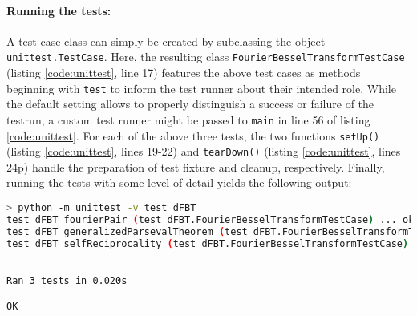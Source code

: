 \documentclass[12pt]{iopart}
\begin{document}
\paragraph{Running the tests:}
A test case class can simply be created by subclassing the object
{\tt{unittest.TestCase}}. Here, the resulting class
{\tt{FourierBesselTransformTestCase}} (listing \ref{code:unittest}, line 17)
features the above test cases as methods beginning with {\tt{test}} to inform
the test runner about their intended role. While the default setting allows to
properly distinguish a success or failure of the testrun, a custom test runner
might be passed to {\tt{main}} in line 56 of listing \ref{code:unittest}.  For
each of the above three tests, the two functions {\tt{setUp()}} (listing
\ref{code:unittest}, lines 19-22) and {\tt{tearDown()}} (listing
\ref{code:unittest}, lines 24p) handle the preparation of test fixture and
cleanup, respectively.  Finally, running the tests with some level of detail
yields the following output:\\ 

\begin{lstlisting}[keywordstyle=\bf, frame=lines, language=Bash,basicstyle=\ttfamily\scriptsize]
> python -m unittest -v test_dFBT
test_dFBT_fourierPair (test_dFBT.FourierBesselTransformTestCase) ... ok
test_dFBT_generalizedParsevalTheorem (test_dFBT.FourierBesselTransformTestCase) ... ok
test_dFBT_selfReciprocality (test_dFBT.FourierBesselTransformTestCase) ... ok

----------------------------------------------------------------------
Ran 3 tests in 0.020s

OK
\end{lstlisting}
\end{document}
